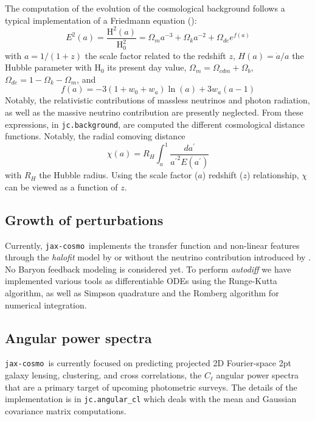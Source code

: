 \documentclass[twocolumn,twocolappendix,nofootinbib,iop]{openjournal}
\newcommand{\JZ}[1]{{\color{purple}JZ: #1}}
\newcommand{\jaxcosmo}{\texttt{jax-cosmo}}
\begin{document}
The computation of the evolution of the cosmological background follows a typical implementation of a Friedmann equation (\citealp[see e.g.][]{2005A&A...443..819P}):
\begin{equation}
    E^2(a) = \frac{\mathrm{H}^2(a)}{\mathrm{H}^2_0} = \Omega_m a^{-3} + \Omega_k a^{-2} + \Omega_{de} e^{f(a)}
\end{equation}
with $a=1/(1+z)$ the scale factor related to the redshift $z$, $H(a)=\dot{a}/a$ the Hubble parameter with $\mathrm{H}_0$ its present day value, $\Omega_m= \Omega_{cdm}+\Omega_b$, $\Omega_{de}=1-\Omega_k-\Omega_m$, and 
\begin{equation}
    f(a) = -3 (1 + w_0 + w_a) \ln(a) + 3 w_a (a - 1)
\end{equation}
Notably, the relativistic contributions of massless neutrinos and photon radiation, as well as the massive neutrino contribution are presently neglected. From these expressions, in \texttt{jc.background}, are computed the different cosmological distance functions. Notably, the radial comoving distance
\begin{equation}
     \chi(a) =  R_H \int_a^1 \frac{da^\prime}{{a^\prime}^2 E(a^\prime)}
     \label{eq:radial_comoving}
\end{equation}
with $R_H$ the Hubble radius. Using the scale factor ($a$) redshift ($z$) relationship, $\chi$ can be viewed as a function of $z$. 
%
\subsection{Growth of perturbations}
%
Currently, \jaxcosmo\  implements the \citet{Eisenstein_1998} transfer function and non-linear features through the \textit{halofit} model by \cite{2012ApJ...761..152T} or \cite{2003MNRAS.341.1311S} without the neutrino contribution introduced by \cite{10.1111/j.1365-2966.2011.20222.x}. No Baryon feedback modeling is considered yet. To perform \textit{autodiff} we have implemented various tools as differentiable ODEs using the Runge-Kutta algorithm, as well as Simpson quadrature and the Romberg algorithm for numerical integration.

%
\subsection{Angular power spectra}
%
\jaxcosmo\ is currently focused on predicting projected 2D Fourier-space 2pt galaxy lensing, clustering, and cross correlations, the $C_\ell$ angular power spectra that are a primary target of upcoming photometric surveys. The details of the implementation is in \texttt{jc.angular\_cl} which deals with the mean and Gaussian covariance matrix computations.
\end{document}
